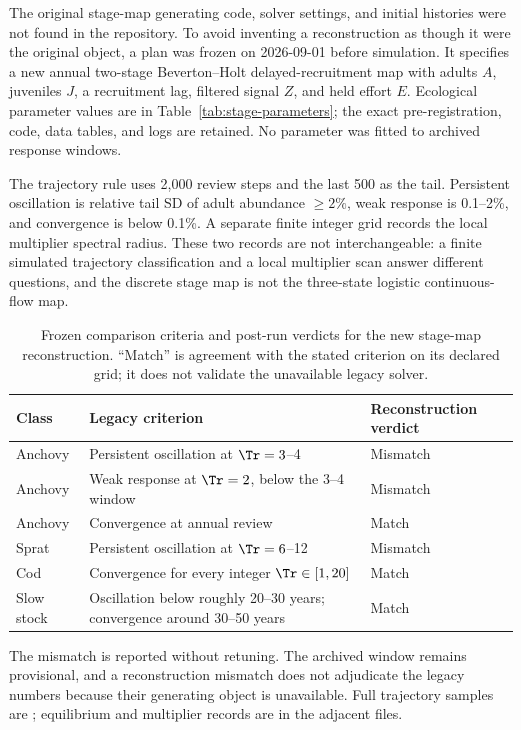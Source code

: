 The original stage-map generating code, solver settings, and initial histories were not found in the repository. To avoid inventing a reconstruction as though it were the original object, a plan was frozen on 2026-09-01 before simulation. It specifies a new annual two-stage Beverton--Holt delayed-recruitment map with adults \(A\), juveniles \(J\), a recruitment lag, filtered signal \(Z\), and held effort \(E\). Ecological parameter values are in Table~\ref{tab:stage-parameters}; the exact pre-registration, code, data tables, and logs are retained. No parameter was fitted to archived response windows.

The trajectory rule uses 2,000 review steps and the last 500 as the tail. Persistent oscillation is relative tail SD of adult abundance \(\geq2\%\), weak response is 0.1--2\%, and convergence is below 0.1\%. A separate finite integer grid records the local multiplier spectral radius. These two records are not interchangeable: a finite simulated trajectory classification and a local multiplier scan answer different questions, and the discrete stage map is not the three-state logistic continuous-flow map.

\begin{table}[htbp]
\centering\small
\caption{Frozen comparison criteria and post-run verdicts for the new stage-map reconstruction. ``Match'' is agreement with the stated criterion on its declared grid; it does not validate the unavailable legacy solver.}
\label{tab:stage-reconstruction-verdict}
\begin{tabularx}{\linewidth}{@{}lXl@{}}
\toprule Class & Legacy criterion & Reconstruction verdict \\
\midrule
Anchovy & Persistent oscillation at \(\Tr=3\)--4 & Mismatch \\
Anchovy & Weak response at \(\Tr=2\), below the 3--4 window & Mismatch \\
Anchovy & Convergence at annual review & Match \\
Sprat & Persistent oscillation at \(\Tr=6\)--12 & Mismatch \\
Cod & Convergence for every integer \(\Tr\in[1,20]\) & Match \\
Slow stock & Oscillation below roughly 20--30 years; convergence around 30--50 years & Match \\
\bottomrule
\end{tabularx}
\end{table}

The mismatch is reported without retuning. The archived window remains provisional, and a reconstruction mismatch does not adjudicate the legacy numbers because their generating object is unavailable. Full trajectory samples are \texttt{}; equilibrium and multiplier records are in the adjacent \texttt{} files.


